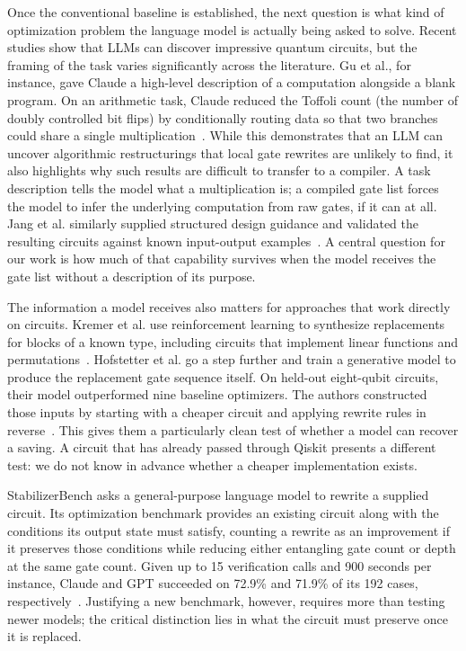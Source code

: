 \documentclass[12pt]{article}
\begin{document}
Once the conventional baseline is established, the next question is what kind of optimization problem
the language model is actually being asked to solve. Recent studies show that LLMs can discover
impressive quantum circuits, but the framing of the task varies significantly across the literature. Gu
et al., for instance, gave Claude a high-level description of a computation alongside a blank program.
On an arithmetic task, Claude reduced the Toffoli count (the number of doubly controlled bit flips) by
conditionally routing data so that two branches could share a single multiplication~\cite{gu}. While
this demonstrates that an LLM can uncover algorithmic restructurings that local gate rewrites are
unlikely to find, it also highlights why such results are difficult to transfer to a compiler. A task
description tells the model what a multiplication is; a compiled gate list forces the model to infer the
underlying computation from raw gates, if it can at all. Jang et al. similarly supplied structured
design guidance and validated the resulting circuits against known input-output examples~\cite{jang}. A
central question for our work is how much of that capability survives when the model receives the gate
list without a description of its purpose.

The information a model receives also matters for approaches that work directly on circuits. Kremer et
al. use reinforcement learning to synthesize replacements for blocks of a known type, including
circuits that implement linear functions and permutations~\cite{kremer}. Hofstetter et al. go a step
further and train a generative model to produce the replacement gate sequence itself. On held-out
eight-qubit circuits, their model outperformed nine baseline optimizers. The authors constructed those
inputs by starting with a cheaper circuit and applying rewrite rules in reverse~\cite{bops}. This gives
them a particularly clean test of whether a model can recover a saving. A circuit that has already
passed through Qiskit presents a different test: we do not know in advance whether a cheaper
implementation exists.

StabilizerBench asks a general-purpose language model to rewrite a supplied circuit. Its optimization benchmark provides an
existing circuit along with the conditions its output state must satisfy, counting a rewrite as an
improvement if it preserves those conditions while reducing either entangling gate count or depth at the
same gate count. Given up to 15 verification calls and 900 seconds per instance, Claude and GPT
succeeded on 72.9\% and 71.9\% of its 192 cases, respectively~\cite{stabilizerbench}. Justifying a new
benchmark, however, requires more than testing newer models; the critical distinction lies in what the
circuit must preserve once it is replaced.
\end{document}
